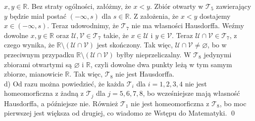 \documentclass{article}
\theoremstyle{definition}%
\theoremstyle{theorem}
\renewenvironment{proof}{{\bfseries Rozwiązanie}}{\qed}
\newcommand{\R}{\mathbb{R}} %
\newcommand{\sT}{\mathcal{T}} %
\newcommand{\oU}{\mathcal{U}}
\newcommand{\oV}{\mathcal{V}}
\begin{document}
\begin{proof}
	$x,y\in\R$. Bez straty ogólności, załóżmy, że $x<y$. Zbiór otwarty w $\sT_{5}$ zawierający $y$ będzie miał postać $(-\infty,s)$ dla $s\in\R$. Z założenia, że  $x<y$ dostajemy $x\in(-\infty,s)$. Teraz udowodnimy, że $\sT_{7}$ nie ma własności Hausdorffa. Weźmy dowolne $x,y\in\R$ oraz $\oU,\oV\in\sT_{7}$ takie, że $x\in\oU$ i $y\in\oV$. Teraz $\oU\cap\oV\in\sT_{7}$, z czego wynika, że $\R\setminus(\oU\cap\oV)$ jest skończony. Tak więc, 
	$\oU\cap\oV\not=\varnothing$, bo w przeciwnym przypadku $\R\setminus(\oU\cap\oV)$ byłby nieprzeliczalny. W $\sT_{8}$ jedynymi zbiorami otwartymi są $\varnothing$ i $\R$, czyli dowolne dwa punkty leżą w tym samym zbiorze, mianowicie $\R$. Tak więc, $\sT_{8}$ nie jest Hausdorffa.\\
	d) Od razu można powiedzieć, że każda $\mathcal{T}_{i}$ dla $i=1,2,3,4$ nie jest homeomorficzna z żadną z $\mathcal{T}_{j}$ dla $j=5,6,7,8$, bo wcześniejsze mają własność Hausdorffa, a późniejsze nie. Również $\mathcal{T}_{1}$ nie jest homeomorficzna z $\mathcal{T}_{8}$, bo moc pierwszej jest większa od drugiej, co wiadomo ze Wstępu do Matematyki.
	\end{proof}
	
\end{document}
